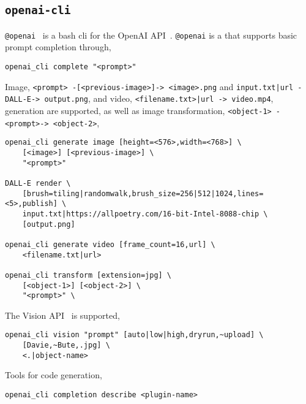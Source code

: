 \subsection{\texttt{openai-cli}}

\texttt{@openai}~ is a bash cli for the OpenAI API~. \texttt{@openai} is a  that supports basic prompt completion through,
%
\begin{verbatim}
openai_cli complete "<prompt>"
\end{verbatim}
%
Image, \texttt{<prompt> -[<previous-image>]-> <image>.png} and \texttt{input.txt|url -DALL-E-> output.png}, and video, \texttt{<filename.txt>|url -> video.mp4}, generation are supported, as well as image transformation, \texttt{<object-1> -<prompt>-> <object-2>},
%
\begin{verbatim}
openai_cli generate image [height=<576>,width=<768>] \
    [<image>] [<previous-image>] \
    "<prompt>"

DALL-E render \
    [brush=tiling|randomwalk,brush_size=256|512|1024,lines=<5>,publish] \
    input.txt|https://allpoetry.com/16-bit-Intel-8088-chip \
    [output.png]

openai_cli generate video [frame_count=16,url] \
    <filename.txt|url>

openai_cli transform [extension=jpg] \
    [<object-1>] [<object-2>] \
    "<prompt>" \
\end{verbatim}
%
The Vision API~ is supported,
%
\begin{verbatim}
openai_cli vision "prompt" [auto|low|high,dryrun,~upload] \
    [Davie,~Bute,.jpg] \
    <.|object-name>
\end{verbatim}
%
Tools for code generation,
%
\begin{verbatim}
openai_cli completion describe <plugin-name>
\end{verbatim}